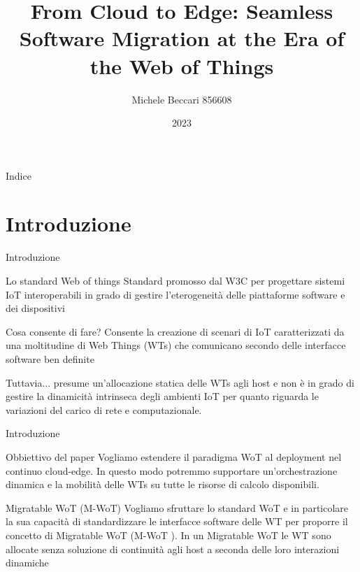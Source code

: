 \documentclass{beamer}
\title{From Cloud to Edge: Seamless Software
	Migration at the Era of the Web of Things}
\author{Michele Beccari 856608}
\date{2023}
\begin{document}
	
	\begin{frame}
		\titlepage
	\end{frame}
	
	\begin{frame}[allowframebreaks]{Indice}
		\tableofcontents
	\end{frame}
	
	\section{Introduzione}
	
	
	\begin{frame}{Introduzione}
		\begin{block}{Lo standard Web of things}
				Standard promosso dal W3C per progettare sistemi IoT interoperabili in grado di gestire l’eterogeneità delle piattaforme software
				e dei dispositivi
		\end{block}
		\begin{exampleblock}{Cosa consente di fare?}
			Consente la creazione di scenari di IoT caratterizzati da una moltitudine di Web Things (WTs)
			che comunicano secondo delle interfacce software ben definite
		\end{exampleblock}
		\begin{alertblock}{Tuttavia...}
			presume un’allocazione statica delle WTs agli host e non è in grado di gestire
			la dinamicità intrinseca degli ambienti IoT per quanto riguarda le variazioni del carico di rete e
			computazionale.
		\end{alertblock}
	\end{frame}

	\begin{frame}{Introduzione}
		\begin{block}{Obbiettivo del paper}
			Vogliamo estendere il paradigma WoT al deployment nel continuo cloud-edge. In
			questo modo potremmo supportare un’orchestrazione dinamica e la mobilità delle WTs su tutte le
			risorse di calcolo disponibili.
		\end{block}
		\begin{block}{Migratable WoT (M-WoT)}
			Vogliamo sfruttare lo
			standard WoT e in particolare la sua capacità di standardizzare le interfacce software delle WT per
			proporre il concetto di Migratable WoT (M-WoT ).
			In un Migratable WoT le WT sono allocate senza soluzione di continuità agli host a seconda delle loro
			interazioni dinamiche
		\end{block}
	\end{frame}
\end{document}
